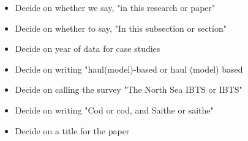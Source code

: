 \documentclass[a4paper 12pt]{article}
\numberwithin{equation}{section}
\begin{document}
\begin{itemize}
\item Decide on whether we say, "in this research or paper"
\item Decide on whether to say, "In this subsection or section"
\item Decide on year of data for case studies
\item Decide on writing "haul(model)-based or haul (model) based
\item Decide on calling the survey "The North Sea IBTS or IBTS"
\item Decide on writing "Cod or cod, and Saithe or saithe"
\item Decide on a title for the paper

\end{itemize}
%
%
%
\end{document}
